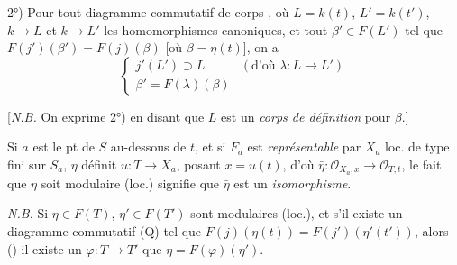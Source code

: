 \documentclass[11pt,a4paper]{article}
\begin{document}
2°) Pour tout diagramme commutatif de corps , où
$L = k(t)$, $L' = k(t')$, $k \to L$ et $k \to L'$ les homomorphismes
canoniques, et tout $\beta' \in F(L')$ tel que
$F(j')(\beta') = F(j)(\beta)$ [où $\beta = \eta(t)$], on a
\[
  \begin{cases}
    j'(L') \supset L & (\text{d'où } \lambda : L \to L') \\
    \beta' = F(\lambda)(\beta)
  \end{cases}
\]



[\emph{N.B.} On  exprime 2°) en disant que $L$ est
un \emph{corps de définition} pour $\beta$.]



Si $a$ est le pt de $S$ au-dessous de $t$, et si $F_a$ est
\emph{représentable} par $X_a$ \struck{\ill{}} loc. de type fini sur $S_a$,
 \ill{} $\eta$ définit $u : T \to X_a$, posant
$x = u(t)$, d'où $\bar{\eta} : \mathcal{O}_{X_a, x} \to \mathcal{O}_{T,t}$,
le fait que $\eta$ soit modulaire (loc.) signifie que $\bar{\eta}$ est un
\emph{isomorphisme}.

 \emph{N.B.} Si $\eta \in F(T)$, $\eta' \in F(T')$ sont
modulaires (loc.), et s'il existe un diagramme commutatif (Q) tel que
$F(j)(\eta(t)) = F(j')(\eta'(t'))$, alors ()
il existe un  $\varphi : T \to T'$  que
$\eta = F(\varphi)(\eta')$.
\end{document}
